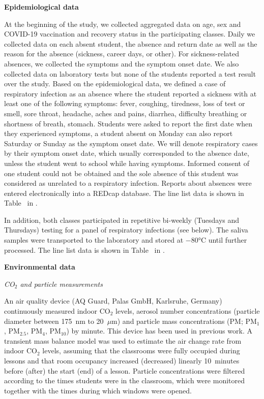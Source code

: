 \documentclass[fleqn,11pt]{wlscirep}
\begin{document}
\noindent\textbf{Epidemiological data} \smallskip

\noindent At the beginning of the study, we collected aggregated data on age, sex and COVID-19 vaccination and recovery status in the participating classes. Daily we collected data on each absent student, \ie the absence and return date as well as the reason for the absence (sickness, career days,  or other). For sickness-related absences, we collected the symptoms and the symptom onset date. We also collected data on laboratory tests but none of the students reported a test result over the study. Based on the epidemiological data, we defined a case of respiratory infection as an absence where the student reported a sickness with at least one of the following symptoms: fever, coughing, tiredness, loss of test or smell, sore throat, headache, aches and pains, diarrhea, difficulty breathing or shortness of breath, stomach. Students were asked to report the first date when they experienced symptoms, \eg a student absent on Monday can also report Saturday or Sunday as the symptom onset date. We will denote respiratory cases by their symptom onset date, which usually corresponded to the absence date, unless the student went to school while having symptoms. Informed consent of one student could not be obtained and the sole absence of this student was considered as unrelated to a respiratory infection. Reports about absences were entered electronically into a REDcap database\cite{Harris2009,Harris2019}. The line list data is shown in Table~ in \supp. 

In addition, both classes participated in repetitive bi-weekly (Tuesdays and Thursdays) testing for a panel of respiratory infections (see  below). The saliva samples were transported to the laboratory and stored at $-$80°C until further processed\cite{Galar2021,To2019,Huber2021}. The line list data is shown in Table~ in \supp. \medskip

\noindent\textbf{Environmental data} \smallskip

\noindent \emph{CO$_2$ and particle measurements} 

\noindent An air quality device (AQ Guard, Palas GmbH, Karlsruhe, Germany) continuously measured indoor CO$_2$ levels, aerosol number concentrations (particle diameter between 175~nm to 20~$\mu$m) and particle mass concentrations (PM; PM$_1$, PM$_{2.5}$, PM$_4$, PM$_{10}$) by minute. This device has been used in previous work\cite{DiGilio2021,Duill2021,Banholzer2023PLoSMed}. A transient mass balance model was used to estimate the air change rate from indoor CO$_2$ levels\cite{Batterman2017IJERPH}, assuming that the classrooms were fully occupied during lessons and that room occupancy increased (decreased) linearly 10~minutes before (after) the start (end) of a lesson. Particle concentrations were filtered according to the times students were in the classroom, which were monitored together with the times during which windows were opened. \medskip
\end{document}
